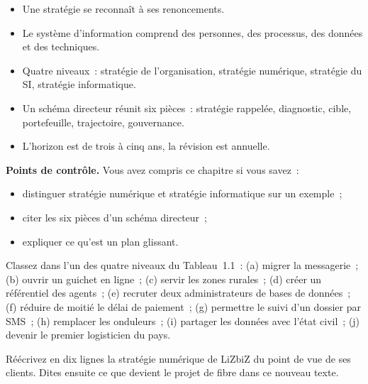 \begin{boxresume}
\begin{itemize}
    \item Une stratégie se reconnaît à ses renoncements.
    \item Le système d'information comprend des personnes, des processus, des données et des techniques.
    \item Quatre niveaux~: stratégie de l'organisation, stratégie numérique, stratégie du SI, stratégie informatique.
    \item Un schéma directeur réunit six pièces~: stratégie rappelée, diagnostic, cible, portefeuille, trajectoire, gouvernance.
    \item L'horizon est de trois à cinq ans, la révision est annuelle.
\end{itemize}
\end{boxresume}

\begin{boxinfo}
\textbf{Points de contrôle.} Vous avez compris ce chapitre si vous savez~:
\begin{itemize}
    \item distinguer stratégie numérique et stratégie informatique sur un exemple~;
    \item citer les six pièces d'un schéma directeur~;
    \item expliquer ce qu'est un plan glissant.
\end{itemize}
\end{boxinfo}

\begin{boxexo}[title={\ding{45}\quad Exercice~1.1. Classer dix phrases \niveaubase}]
Classez dans l'un des quatre niveaux du Tableau~1.1~: (a) migrer la messagerie~; (b) ouvrir un guichet en ligne~; (c) servir les zones rurales~; (d) créer un référentiel des agents~; (e) recruter deux administrateurs de bases de données~; (f) réduire de moitié le délai de paiement~; (g) permettre le suivi d'un dossier par SMS~; (h) remplacer les onduleurs~; (i) partager les données avec l'état civil~; (j) devenir le premier logisticien du pays.
\end{boxexo}

\begin{boxexo}[title={\ding{45}\quad Exercice~1.2. La stratégie de LiZbiZ \niveaumoyen}]
Réécrivez en dix lignes la stratégie numérique de LiZbiZ du point de vue de ses clients. Dites ensuite ce que devient le projet de fibre dans ce nouveau texte.
\end{boxexo}

